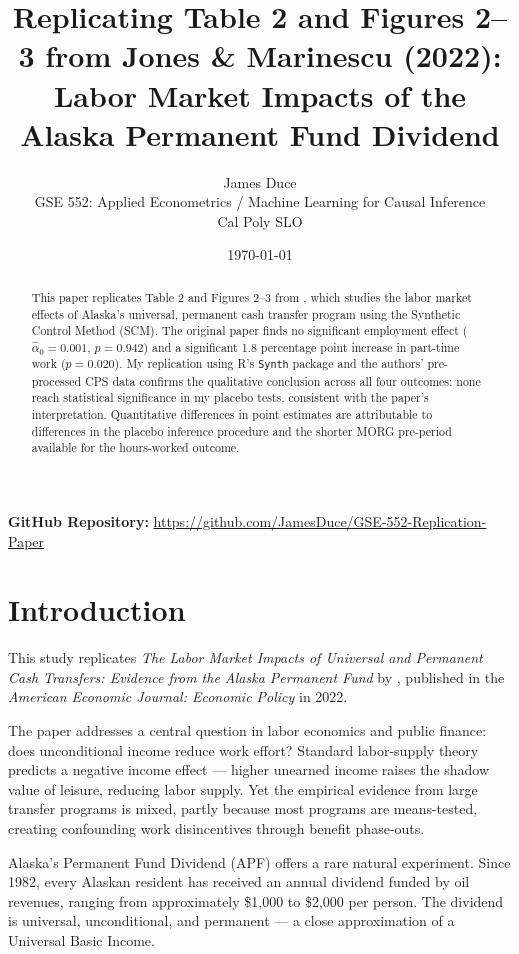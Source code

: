 \documentclass[12pt]{article}
\title{Replicating Table 2 and Figures 2--3 from Jones \& Marinescu (2022):\\
\large Labor Market Impacts of the Alaska Permanent Fund Dividend}
\author{James Duce\\
\small GSE 552: Applied Econometrics / Machine Learning for Causal Inference\\
\small Cal Poly SLO}
\date{\today}
\begin{document}
\maketitle

\noindent\textbf{GitHub Repository:} \url{https://github.com/JamesDuce/GSE-552-Replication-Paper}

\bigskip

\begin{abstract}
This paper replicates Table 2 and Figures 2--3 from \citet{jones2022labor}, which studies the labor market effects of Alaska's universal, permanent cash transfer program using the Synthetic Control Method (SCM). The original paper finds no significant employment effect ($\hat{\alpha}_0 = 0.001$, $p = 0.942$) and a significant 1.8 percentage point increase in part-time work ($p = 0.020$). My replication using R's \texttt{Synth} package and the authors' pre-processed CPS data confirms the qualitative conclusion across all four outcomes: none reach statistical significance in my placebo tests, consistent with the paper's interpretation. Quantitative differences in point estimates are attributable to differences in the placebo inference procedure and the shorter MORG pre-period available for the hours-worked outcome.
\end{abstract}

\section{Introduction}

This study replicates \textit{The Labor Market Impacts of Universal and Permanent Cash Transfers: Evidence from the Alaska Permanent Fund} by \citet{jones2022labor}, published in the \textit{American Economic Journal: Economic Policy} in 2022.

The paper addresses a central question in labor economics and public finance: does unconditional income reduce work effort? Standard labor-supply theory predicts a negative income effect — higher unearned income raises the shadow value of leisure, reducing labor supply. Yet the empirical evidence from large transfer programs is mixed, partly because most programs are means-tested, creating confounding work disincentives through benefit phase-outs.

Alaska's Permanent Fund Dividend (APF) offers a rare natural experiment. Since 1982, every Alaskan resident has received an annual dividend funded by oil revenues, ranging from approximately \$1,000 to \$2,000 per person. The dividend is universal, unconditional, and permanent — a close approximation of a Universal Basic Income.
\end{document}
